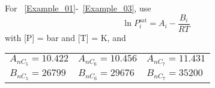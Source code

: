 \documentclass[12pts,a4paper,amsmath,amssymb,floatfix]{article}%
\newcommand{\frc}{\displaystyle\frac}
\begin{document}
For ~\ref{Example_01}-~\ref{Example_03}, use 
\begin{displaymath}
   \ln P_{i}^{\text{sat}} = A_{i} - \frc{B_{i}}{RT}
\end{displaymath} 
with [P] = bar and [T] = K, and
    \begin{center}
       \begin{tabular}{l l l} 
          $A_{nC_{5}}=10.422$ & $A_{nC_{6}}=10.456$ & $A_{nC_{7}}=11.431$ \\
          $B_{nC_{5}}=26799$  & $B_{nC_{6}}=29676$  & $B_{nC_{7}}=35200$  
       \end{tabular}
    \end{center}

%
\end{document}
